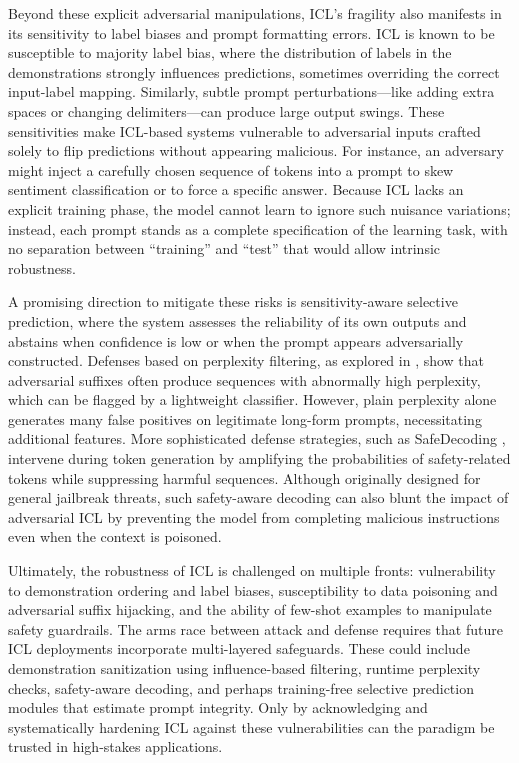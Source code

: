 \documentclass[11pt]{article}
\begin{document}
Beyond these explicit adversarial manipulations, ICL's fragility also manifests in its sensitivity to label biases and prompt formatting errors. ICL is known to be susceptible to majority label bias, where the distribution of labels in the demonstrations strongly influences predictions, sometimes overriding the correct input-label mapping. Similarly, subtle prompt perturbations---like adding extra spaces or changing delimiters---can produce large output swings. These sensitivities make ICL-based systems vulnerable to adversarial inputs crafted solely to flip predictions without appearing malicious. For instance, an adversary might inject a carefully chosen sequence of tokens into a prompt to skew sentiment classification or to force a specific answer. Because ICL lacks an explicit training phase, the model cannot learn to ignore such nuisance variations; instead, each prompt stands as a complete specification of the learning task, with no separation between ``training'' and ``test'' that would allow intrinsic robustness.

A promising direction to mitigate these risks is sensitivity-aware selective prediction, where the system assesses the reliability of its own outputs and abstains when confidence is low or when the prompt appears adversarially constructed. Defenses based on perplexity filtering, as explored in \cite{ref177}, show that adversarial suffixes often produce sequences with abnormally high perplexity, which can be flagged by a lightweight classifier. However, plain perplexity alone generates many false positives on legitimate long-form prompts, necessitating additional features. More sophisticated defense strategies, such as SafeDecoding \cite{ref178}, intervene during token generation by amplifying the probabilities of safety-related tokens while suppressing harmful sequences. Although originally designed for general jailbreak threats, such safety-aware decoding can also blunt the impact of adversarial ICL by preventing the model from completing malicious instructions even when the context is poisoned.

Ultimately, the robustness of ICL is challenged on multiple fronts: vulnerability to demonstration ordering and label biases, susceptibility to data poisoning and adversarial suffix hijacking, and the ability of few-shot examples to manipulate safety guardrails. The arms race between attack and defense requires that future ICL deployments incorporate multi-layered safeguards. These could include demonstration sanitization using influence-based filtering, runtime perplexity checks, safety-aware decoding, and perhaps training-free selective prediction modules that estimate prompt integrity. Only by acknowledging and systematically hardening ICL against these vulnerabilities can the paradigm be trusted in high-stakes applications.
\end{document}
